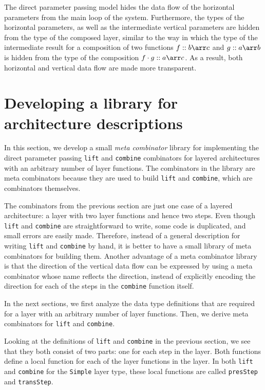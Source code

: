 The direct parameter passing model hides the data flow of the horizontal parameters from the main loop of the system. Furthermore, the types of the horizontal parameters, as well as the intermediate vertical parameters are hidden from the type of the composed layer, similar to the way in which the type of the intermediate result for a composition of two functions $f :: b \arr c$ and $g :: a \arr b$ is hidden from the type of the composition $f \cdot g :: a \arr c$. As a result, both horizontal and vertical data flow are made more transparent.


%									
%									
%									
\section{Developing a library for architecture descriptions} \label{sectlib}

In this section, we develop a small {\em meta combinator} library for implementing the direct parameter passing \texttt{lift} and \texttt{combine} combinators for layered architectures with an arbitrary number of layer functions. The combinators in the library are meta combinators because they are used to build \texttt{lift} and \texttt{combine}, which are combinators themselves.

The combinators from the previous section are just one case of a layered architecture: a layer with two layer functions and hence two steps. Even though \texttt{lift} and \texttt{combine} are straightforward to write, some code is duplicated, and small errors are easily made. Therefore, instead of a general description for writing \texttt{lift} and \texttt{combine} by hand, it is better to have a small library of meta combinators for building them. Another advantage of a meta combinator library is that the direction of the vertical data flow can be expressed by using a meta combinator whose name reflects the direction, instead of explicitly encoding the direction for each of the steps in the \texttt{combine} function itself.

In the next sections, we first analyze the data type definitions that are required for a layer with an arbitrary number of layer functions. Then, we derive meta combinators for \texttt{lift} and \texttt{combine}. 

Looking at the definitions of \texttt{lift} and \texttt{combine} in the previous section, we see that they both consist of two parts: one for each step in the layer. Both functions define a local function for each of the layer functions in the layer. In both \texttt{lift} and \texttt{combine} for the \texttt{Simple} layer type, these local functions are called \texttt{presStep} and \texttt{transStep}. 

